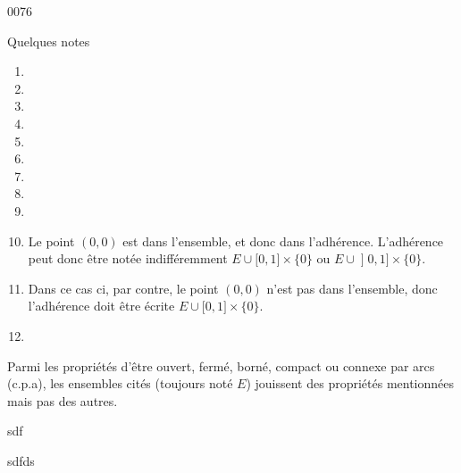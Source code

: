 
\begin{corrige}{0076}

Quelques notes
\begin{enumerate}
\item 
\item 
\item 
\item 
\item 
\item 
\item 
\item 
\item 
\item 
Le point $(0,0)$ est dans l'ensemble, et donc dans l'adhérence. L'adhérence peut donc être notée indifféremment $E \cup \mathopen[0,1\mathclose]\times\{0\}$ ou $E \cup \mathopen]0,1\mathclose]\times\{0\}$.

\item 
Dans ce cas ci, par contre, le point $(0,0)$ n'est pas dans l'ensemble, donc l'adhérence doit être écrite $E \cup \mathopen[0,1\mathclose]\times\{0\}$.
\item 
\end{enumerate}

Parmi les propriétés d'être ouvert, fermé, borné, compact ou connexe par arcs (c.p.a), les ensembles cités (toujours noté $E$) jouissent des propriétés mentionnées mais pas des autres.

sdf

\begin{landscape}
    sdfds
\end{landscape}
\end{corrige}
